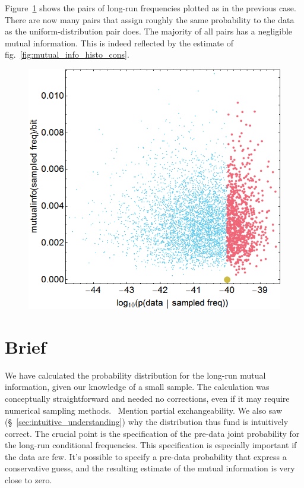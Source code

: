 \documentclass[\ifafour a4paper,12pt,\else a5paper,10pt,\fi%
onecolumn,oneside,article,%
british%
]{memoir}
\theoremstyle{remark}
\theoremstyle{innote}
\renewcommand*{\|}{\nonscript\,\vert\nonscript\;\mathopen{}}
\newcommand*{\sect}{\S}%
\newcommand*{\fig}{fig.}%
\newcommand*{\puzzle}{{\fontencoding{U}\fontfamily{fontawesometwo}\selectfont\symbol{225}}}
\newcommand{\mynote}[1]{ {\color{notecolour}\puzzle\ #1}}
\begin{document}
Figure~\ref{fig:init_scatter_cons} shows the pairs of long-run frequencies
plotted as in the previous case. There are now many pairs that assign
roughly the same probability to the data as the uniform-distribution pair
does. The majority of all pairs has a negligible mutual information. This
is indeed reflected by the estimate of
\fig~\ref{fig:mutual_info_histo_cons}.
\begin{figure}[b!]
\centering\includegraphics[width=0.75\linewidth]{B_init_scatter.png}\\
\caption{}\label{fig:init_scatter_cons}
\end{figure}%


\section{Brief}
\label{sec:discussion}


We have calculated the probability distribution for the long-run mutual
information, given our knowledge of a small sample. The calculation was
conceptually straightforward and needed no corrections, even if it may
require numerical sampling methods. \mynote{Mention partial
  exchangeability.} We also saw (\sect~\ref{sec:intuitive_understanding})
why the distribution thus fund is intuitively correct. The crucial point is
the specification of the pre-data joint probability for the long-run
conditional frequencies. This specification is especially important if the
data are few. It's possible to specify a pre-data probability that express
a conservative guess, and the resulting estimate of the mutual information
is very close to zero.
\end{document}
